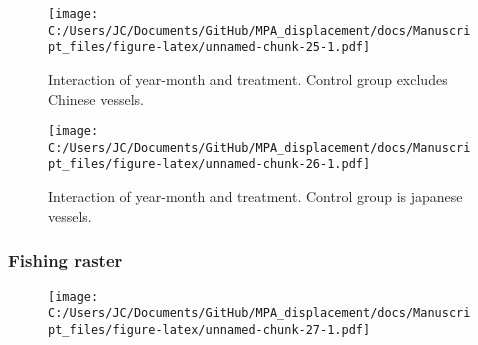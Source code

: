 \documentclass[11pt,]{article}
\begin{document}
\begin{figure}
\centering
\texttt{[image: C:/Users/JC/Documents/GitHub/MPA\_displacement/docs/Manuscript\_files/figure-latex/unnamed-chunk-25-1.pdf]}
\caption{\label{fig:unnamed-chunk-25}\label{fig:ym3}Interaction of
year-month and treatment. Control group excludes Chinese vessels.}
\end{figure}

\begin{figure}
\centering
\texttt{[image: C:/Users/JC/Documents/GitHub/MPA\_displacement/docs/Manuscript\_files/figure-latex/unnamed-chunk-26-1.pdf]}
\caption{\label{fig:unnamed-chunk-26}\label{fig:ym4}Interaction of
year-month and treatment. Control group is japanese vessels.}
\end{figure}

\hypertarget{fishing-raster}{%
\subsubsection{Fishing raster}\label{fishing-raster}}

\begin{figure}
\centering
\texttt{[image: C:/Users/JC/Documents/GitHub/MPA\_displacement/docs/Manuscript\_files/figure-latex/unnamed-chunk-27-1.pdf]}
\caption{\label{fig:unnamed-chunk-27}\label{fig:fishing_raster_full}}
\end{figure}

\clearpage


\end{document}
